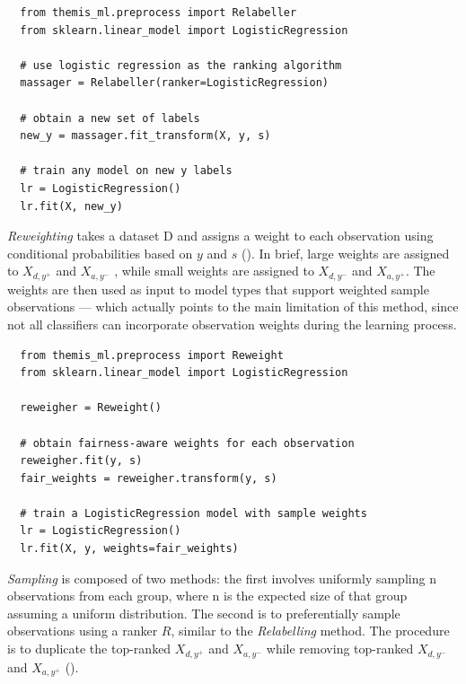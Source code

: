 \documentclass[man,natbib]{apa6}
\begin{document}
\begin{verbatim}
  from themis_ml.preprocess import Relabeller
  from sklearn.linear_model import LogisticRegression

  # use logistic regression as the ranking algorithm
  massager = Relabeller(ranker=LogisticRegression)

  # obtain a new set of labels
  new_y = massager.fit_transform(X, y, s)

  # train any model on new y labels
  lr = LogisticRegression()
  lr.fit(X, new_y)
\end{verbatim}

\emph{Reweighting} takes a dataset D and assigns a weight to each observation
using conditional probabilities based on \(y\) and \(s\) (\citealp{kamiran2012data}).
In brief, large weights are assigned to \(X_{d, y^{+}}\) and \(X_{a, y^{-}}\) ,
while small weights are assigned to \(X_{d, y^{-}}\) and \(X_{a, y^{+}}\). The
weights are then used as input to model types that support weighted sample
observations --- which actually points to the main limitation of this method,
since not all classifiers can incorporate observation weights during the
learning process.

\begin{verbatim}
  from themis_ml.preprocess import Reweight
  from sklearn.linear_model import LogisticRegression

  reweigher = Reweight()

  # obtain fairness-aware weights for each observation
  reweigher.fit(y, s)
  fair_weights = reweigher.transform(y, s)

  # train a LogisticRegression model with sample weights
  lr = LogisticRegression()
  lr.fit(X, y, weights=fair_weights)
\end{verbatim}

\emph{Sampling} is composed of two methods: the first involves uniformly
sampling n observations from each group, where n is the expected size of that
group assuming a uniform distribution. The second is to preferentially sample
observations using a ranker \(R\), similar to the \emph{Relabelling} method. The
procedure is to duplicate the top-ranked \(X_{d, y^{+}}\) and \(X_{a, y^{-}}\)
while removing top-ranked \(X_{d, y^{-}}\) and \(X_{a, y^{+}}\)
(\citealp{kamiran2012data}).
\end{document}
